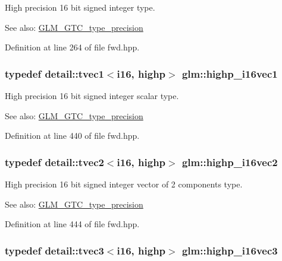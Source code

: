 High precision 16 bit signed integer type. \begin{Desc}
\item[See also:]\hyperlink{group__gtc__type__precision}{GLM\_\-GTC\_\-type\_\-precision} \end{Desc}


Definition at line 264 of file fwd.hpp.\hypertarget{group__gtc__type__precision_g0ed3103e2d3acb4efbe313add4243a72}{
\subsubsection[highp\_\-i16vec1]{\setlength{\rightskip}{0pt plus 5cm}typedef detail::tvec1$<$i16, highp$>$ {\bf glm::highp\_\-i16vec1}}}
\label{group__gtc__type__precision_g0ed3103e2d3acb4efbe313add4243a72}


High precision 16 bit signed integer scalar type. \begin{Desc}
\item[See also:]\hyperlink{group__gtc__type__precision}{GLM\_\-GTC\_\-type\_\-precision} \end{Desc}


Definition at line 440 of file fwd.hpp.\hypertarget{group__gtc__type__precision_g74df9e215c049f82d277473c4c974bb4}{
\subsubsection[highp\_\-i16vec2]{\setlength{\rightskip}{0pt plus 5cm}typedef detail::tvec2$<$i16, highp$>$ {\bf glm::highp\_\-i16vec2}}}
\label{group__gtc__type__precision_g74df9e215c049f82d277473c4c974bb4}


High precision 16 bit signed integer vector of 2 components type. \begin{Desc}
\item[See also:]\hyperlink{group__gtc__type__precision}{GLM\_\-GTC\_\-type\_\-precision} \end{Desc}


Definition at line 444 of file fwd.hpp.\hypertarget{group__gtc__type__precision_g8dcfd412bd9ce99a1cf5c2b6e50f07e7}{
\subsubsection[highp\_\-i16vec3]{\setlength{\rightskip}{0pt plus 5cm}typedef detail::tvec3$<$i16, highp$>$ {\bf glm::highp\_\-i16vec3}}}
\label{group__gtc__type__precision_g8dcfd412bd9ce99a1cf5c2b6e50f07e7}


